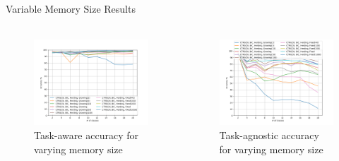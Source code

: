 \documentclass[aspectratio=169, xcolor=dvipsnames]{beamer}
\begin{document}
\begin{frame}{Variable Memory Size Results}
      \framesubtitle{}%
      
      \begin{columns}
      \begin{figure}[ht!]
            \centering
            \includegraphics[width=\textwidth]{images/mem_sizes_TAw_Acc.png}
            \caption{Task-aware accuracy for varying memory size}
      \end{figure}
      
      \begin{figure}[ht!]
            \centering
            \includegraphics[width=\textwidth]{images/mem_sizes_TAg_Acc.png}
            \caption{Task-agnostic accuracy for varying memory size}
      \end{figure} 
      \end{columns}
\end{frame}
\end{document}

